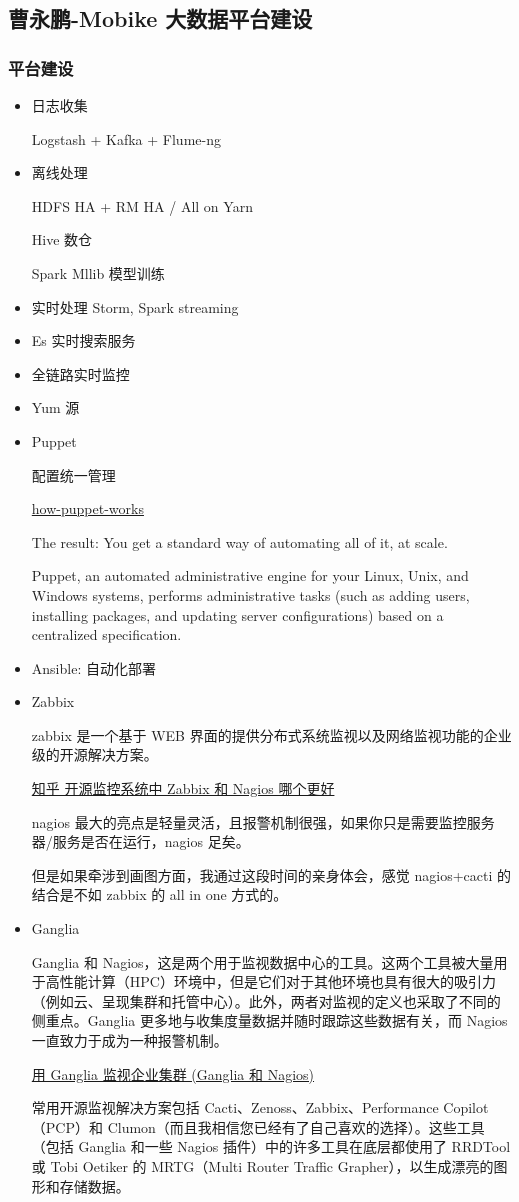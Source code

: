 \documentclass[hyperref, UTF-8]{ctexart}
\begin{document}
\subsection{曹永鹏-Mobike 大数据平台建设}
\label{sec:orgfa27ce4}
\subsubsection{平台建设}
\label{sec:org79469b1}
\begin{itemize}
\item 日志收集

Logstash + Kafka + Flume-ng
\item 离线处理

HDFS HA + RM HA / All on Yarn

Hive 数仓

Spark Mllib 模型训练
\item 实时处理
Storm, Spark streaming
\item Es 实时搜索服务
\item 全链路实时监控
\item Yum 源
\item Puppet

配置统一管理

\href{https://puppet.com/products/how-puppet-works}{how-puppet-works}

The result: You get a standard way of automating all of it, at scale.

Puppet, an automated administrative engine for your Linux, Unix, and Windows systems, performs administrative tasks (such as adding users, installing packages, and updating server configurations) based on a centralized specification.
\item Ansible:  自动化部署
\item Zabbix

zabbix 是一个基于 WEB 界面的提供分布式系统监视以及网络监视功能的企业级的开源解决方案。

\href{https://www.zhihu.com/question/19973178}{知乎 开源监控系统中 Zabbix 和 Nagios 哪个更好} 

nagios 最大的亮点是轻量灵活，且报警机制很强，如果你只是需要监控服务器/服务是否在运行，nagios 足矣。

但是如果牵涉到画图方面，我通过这段时间的亲身体会，感觉 nagios+cacti 的结合是不如 zabbix 的 all in one 方式的。
\item Ganglia

Ganglia 和 Nagios，这是两个用于监视数据中心的工具。这两个工具被大量用于高性能计算（HPC）环境中，但是它们对于其他环境也具有很大的吸引力（例如云、呈现集群和托管中心）。此外，两者对监视的定义也采取了不同的侧重点。Ganglia 更多地与收集度量数据并随时跟踪这些数据有关，而 Nagios 一直致力于成为一种报警机制。

\href{https://www.ibm.com/developerworks/cn/linux/l-ganglia-nagios-1/index.html}{用 Ganglia 监视企业集群 (Ganglia 和 Nagios)}

常用开源监视解决方案包括 Cacti、Zenoss、Zabbix、Performance Copilot（PCP）和 Clumon（而且我相信您已经有了自己喜欢的选择）。这些工具（包括 Ganglia 和一些 Nagios 插件）中的许多工具在底层都使用了 RRDTool 或 Tobi Oetiker 的 MRTG（Multi Router Traffic Grapher），以生成漂亮的图形和存储数据。
\end{itemize}
\end{document}
